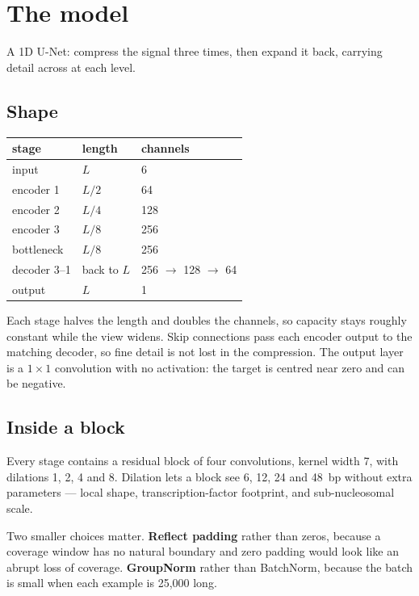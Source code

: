 \documentclass[11pt,a4paper]{article}
\begin{document}
\section{The model}

A 1D U-Net: compress the signal three times, then expand it back, carrying detail
across at each level.

\subsection{Shape}

\begin{center}
\begin{tabular}{lll}
\toprule
\textbf{stage} & \textbf{length} & \textbf{channels} \\
\midrule
input        & $L$   & 6 \\
encoder 1    & $L/2$ & 64 \\
encoder 2    & $L/4$ & 128 \\
encoder 3    & $L/8$ & 256 \\
bottleneck   & $L/8$ & 256 \\
decoder 3--1 & back to $L$ & 256 $\to$ 128 $\to$ 64 \\
output       & $L$   & 1 \\
\bottomrule
\end{tabular}
\end{center}

Each stage halves the length and doubles the channels, so capacity stays roughly
constant while the view widens. Skip connections pass each encoder output to the
matching decoder, so fine detail is not lost in the compression. The output layer
is a $1\times1$ convolution with no activation: the target is centred near zero and
can be negative.

\subsection{Inside a block}

Every stage contains a residual block of four convolutions, kernel width 7, with
dilations 1, 2, 4 and 8. Dilation lets a block see 6, 12, 24 and 48~bp without
extra parameters --- local shape, transcription-factor footprint, and
sub-nucleosomal scale.

Two smaller choices matter. \textbf{Reflect padding} rather than zeros, because a
coverage window has no natural boundary and zero padding would look like an abrupt
loss of coverage. \textbf{GroupNorm} rather than BatchNorm, because the batch is
small when each example is 25{,}000 long.
\end{document}
